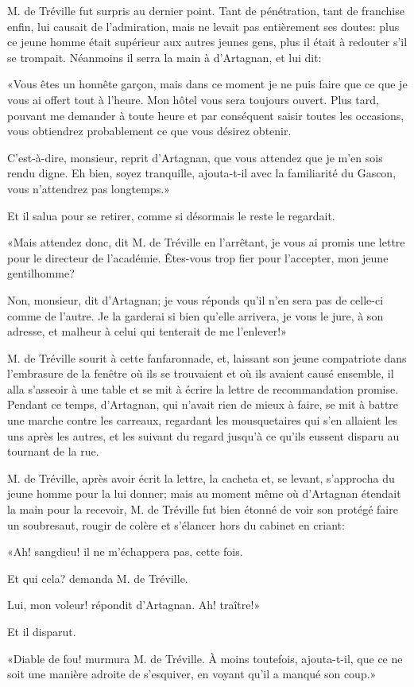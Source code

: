 M. de Tréville fut surpris au dernier point. Tant de pénétration, tant de franchise enfin, lui causait de l'admiration, mais ne levait pas entièrement ses doutes: plus ce jeune homme était supérieur aux autres jeunes gens, plus il était à redouter s'il se trompait. Néanmoins il serra la main à d'Artagnan, et lui dit: 

«Vous êtes un honnête garçon, mais dans ce moment je ne puis faire que ce que je vous ai offert tout à l'heure. Mon hôtel vous sera toujours ouvert. Plus tard, pouvant me demander à toute heure et par conséquent saisir toutes les occasions, vous obtiendrez probablement ce que vous désirez obtenir. 

\speak  C'est-à-dire, monsieur, reprit d'Artagnan, que vous attendez que je m'en sois rendu digne. Eh bien, soyez tranquille, ajouta-t-il avec la familiarité du Gascon, vous n'attendrez pas longtemps.» 

Et il salua pour se retirer, comme si désormais le reste le regardait. 

«Mais attendez donc, dit M. de Tréville en l'arrêtant, je vous ai promis une lettre pour le directeur de l'académie. Êtes-vous trop fier pour l'accepter, mon jeune gentilhomme? 

\speak  Non, monsieur, dit d'Artagnan; je vous réponds qu'il n'en sera pas de celle-ci comme de l'autre. Je la garderai si bien qu'elle arrivera, je vous le jure, à son adresse, et malheur à celui qui tenterait de me l'enlever!» 

M. de Tréville sourit à cette fanfaronnade, et, laissant son jeune compatriote dans l'embrasure de la fenêtre où ils se trouvaient et où ils avaient causé ensemble, il alla s'asseoir à une table et se mit à écrire la lettre de recommandation promise. Pendant ce temps, d'Artagnan, qui n'avait rien de mieux à faire, se mit à battre une marche contre les carreaux, regardant les mousquetaires qui s'en allaient les uns après les autres, et les suivant du regard jusqu'à ce qu'ils eussent disparu au tournant de la rue. 

M. de Tréville, après avoir écrit la lettre, la cacheta et, se levant, s'approcha du jeune homme pour la lui donner; mais au moment même où d'Artagnan étendait la main pour la recevoir, M. de Tréville fut bien étonné de voir son protégé faire un soubresaut, rougir de colère et s'élancer hors du cabinet en criant: 

«Ah! sangdieu! il ne m'échappera pas, cette fois. 

\speak  Et qui cela? demanda M. de Tréville. 

\speak  Lui, mon voleur! répondit d'Artagnan. Ah! traître!» 

Et il disparut. 

«Diable de fou! murmura M. de Tréville. À moins toutefois, ajouta-t-il, que ce ne soit une manière adroite de s'esquiver, en voyant qu'il a manqué son coup.»